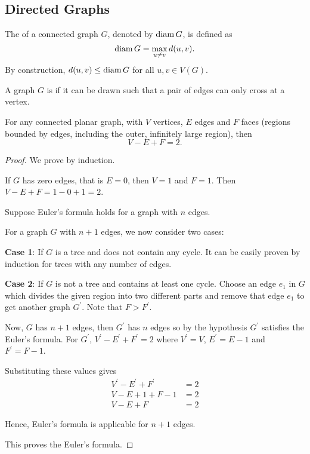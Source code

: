 \subsection{Directed Graphs}




\begin{definition}[Diameter]
The  of a connected graph $G$, denoted by $\operatorname{diam} G$, is defined as
\[\operatorname{diam} G=\max_{u\neq v}d(u,v).\]
By construction, $d(u,v) \le \operatorname{diam} G$ for all $u,v \in V(G)$.
\end{definition}

\begin{definition}
A graph $G$ is  if it can be drawn such that a pair of edges can only cross at a vertex.
\end{definition}

\begin{theorem}
For any connected planar graph, with $V$ vertices, $E$ edges and $F$ faces (regions bounded by edges, including the outer, infinitely large region), then
\begin{equation}
V-E+F=2.
\end{equation}
\end{theorem}

\begin{proof}
We prove by induction.

If $G$ has zero edges, that is $E=0$, then $V=1$ and $F=1$. Then $V-E+F=1-0+1=2$.

Suppose Euler's formula holds for a graph with $n$ edges.

For a graph $G$ with $n+1$ edges, we now consider two cases:

\textbf{Case 1}: If $G$ is a tree and does not contain any cycle. It can be easily proven by induction for trees with any number of edges.

\textbf{Case 2}: If $G$ is not a tree and contains at least one cycle. Choose an edge $e_1$ in $G$ which divides the given region into two different parts and remove that edge $e_1$ to get another graph $G^\prime$. Note that $F>F^\prime$.

Now, $G$ has $n+1$ edges, then $G^\prime$ has $n$ edges so by the hypothesis $G^\prime$ satisfies the Euler's formula. For $G^\prime$, $V^\prime-E^\prime+F^\prime=2$ where $V^\prime=V$, $E^\prime=E-1$ and $F^\prime=F-1$.

Substituting these values gives
\begin{align*}
V^\prime-E^\prime+F^\prime&=2\\
V-E+1+F-1&=2\\
V-E+F&=2
\end{align*}

Hence, Euler's formula is applicable for $n+1$ edges.

This proves the Euler's formula.
\end{proof}

